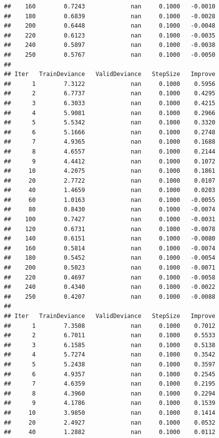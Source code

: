 \documentclass[]{book}
\begin{document}
\begin{verbatim}
##    160        0.7243             nan     0.1000   -0.0010
##    180        0.6839             nan     0.1000   -0.0028
##    200        0.6448             nan     0.1000   -0.0048
##    220        0.6123             nan     0.1000   -0.0035
##    240        0.5897             nan     0.1000   -0.0038
##    250        0.5767             nan     0.1000   -0.0050
## 
## Iter   TrainDeviance   ValidDeviance   StepSize   Improve
##      1        7.3122             nan     0.1000    0.5956
##      2        6.7737             nan     0.1000    0.4295
##      3        6.3033             nan     0.1000    0.4215
##      4        5.9081             nan     0.1000    0.2966
##      5        5.5342             nan     0.1000    0.3320
##      6        5.1666             nan     0.1000    0.2748
##      7        4.9365             nan     0.1000    0.1688
##      8        4.6557             nan     0.1000    0.2144
##      9        4.4412             nan     0.1000    0.1072
##     10        4.2075             nan     0.1000    0.1861
##     20        2.7722             nan     0.1000    0.0107
##     40        1.4659             nan     0.1000    0.0203
##     60        1.0163             nan     0.1000   -0.0055
##     80        0.8430             nan     0.1000   -0.0074
##    100        0.7427             nan     0.1000   -0.0031
##    120        0.6731             nan     0.1000   -0.0078
##    140        0.6151             nan     0.1000   -0.0080
##    160        0.5814             nan     0.1000   -0.0074
##    180        0.5452             nan     0.1000   -0.0054
##    200        0.5023             nan     0.1000   -0.0071
##    220        0.4697             nan     0.1000   -0.0058
##    240        0.4340             nan     0.1000   -0.0022
##    250        0.4207             nan     0.1000   -0.0088
## 
## Iter   TrainDeviance   ValidDeviance   StepSize   Improve
##      1        7.3508             nan     0.1000    0.7012
##      2        6.7011             nan     0.1000    0.5533
##      3        6.1585             nan     0.1000    0.5138
##      4        5.7274             nan     0.1000    0.3542
##      5        5.2438             nan     0.1000    0.3597
##      6        4.9357             nan     0.1000    0.2545
##      7        4.6359             nan     0.1000    0.2195
##      8        4.3960             nan     0.1000    0.2294
##      9        4.1786             nan     0.1000    0.1539
##     10        3.9850             nan     0.1000    0.1414
##     20        2.4927             nan     0.1000    0.0532
##     40        1.2882             nan     0.1000    0.0112

\end{verbatim}
\end{document}
